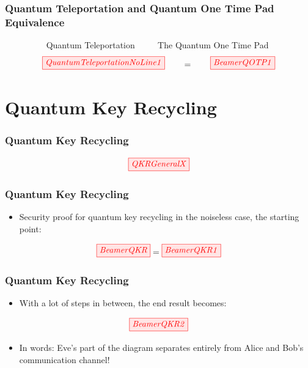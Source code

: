 \documentclass[]{beamer}
\begin{document}
\begin{frame}
	\frametitle{Quantum Teleportation and Quantum One Time Pad Equivalence}
~~~~~~~~~	Quantum Teleportation ~~~~ The Quantum One Time Pad
	\begin{equation}
	\tikzfig{QuantumTeleportationNoLine1} ~~~~~~=~~~~~~ \tikzfig{BeamerQOTP1} %
	\end{equation}
\end{frame}

\section{Quantum Key Recycling}
\begin{frame}
	\centering 
	\Huge
\end{frame}
\begin{frame}
	\frametitle{Quantum Key Recycling}
	\begin{equation}
	\tikzfig{QKRGeneralX}
	\end{equation}
\end{frame}

\begin{frame}
	\frametitle{Quantum Key Recycling}
	\begin{itemize}
		\item Security proof for quantum key recycling in the noiseless case, the starting point:
		\vspace{0.5cm}
	\end{itemize}
	\begin{equation}
		\tikzfig{BeamerQKR} = \tikzfig{BeamerQKR1} 
	\end{equation}
\end{frame}

\begin{frame}
	\frametitle{Quantum Key Recycling}
	\begin{itemize}
		\item With a lot of steps in between, the end result becomes:
		\vspace{0.5cm}
	\end{itemize}
	\begin{equation}
	\tikzfig{BeamerQKR2}
	\end{equation}
		\begin{itemize}
		\item In words: Eve's part of the diagram separates entirely from Alice and Bob's communication channel!
	\end{itemize}
\end{frame}
\end{document}
